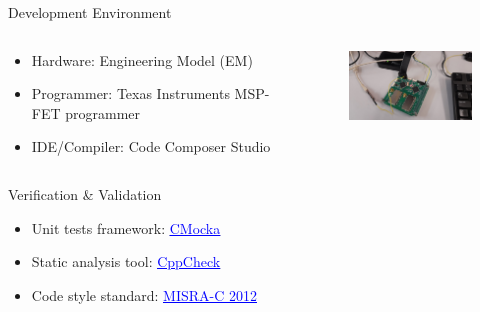 \begin{frame}{Development Environment}

    \begin{columns}[t]
        \begin{column}[t]{0.6\textwidth}
            \begin{itemize}
                \vspace{0.4cm}
                \item Hardware: Engineering Model (EM)
                \vspace{0.4cm}
                \item Programmer: Texas Instruments MSP-FET programmer
                \vspace{0.4cm}
                \item IDE/Compiler: Code Composer Studio
                \vspace{0.4cm}
            \end{itemize}
        \end{column}
        \begin{column}[t]{0.5\textwidth}
            \vspace{1cm}
            \begin{figure}[!ht]
                \begin{center}
                    \includegraphics[width=5cm]{figures/ttc2-bench.jpg}
                \end{center}
            \end{figure}
        \end{column}
    \end{columns}

\end{frame}


\begin{frame}{Verification \& Validation}

    \begin{itemize}
        \item Unit tests framework: \href{https://cmocka.org/}{\textcolor{blue}{\underline{CMocka}}}
        \vspace{0.5cm}
        \item Static analysis tool: \href{https://cppcheck.sourceforge.io/}{\textcolor{blue}{\underline{CppCheck}}}
        \vspace{0.5cm}
        \item Code style standard: \href{https://www.misra.org.uk/}{\textcolor{blue}{\underline{MISRA-C 2012}}}
    \end{itemize}

\end{frame}

